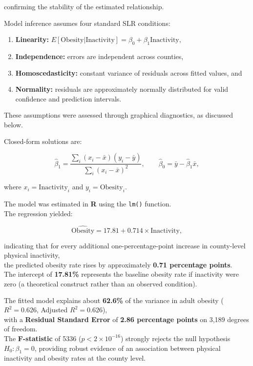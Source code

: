 \documentclass[
  letterpaper,
  DIV=11,
  numbers=noendperiod]{scrartcl}
\providecommand{\tightlist}{%
  \setlength{\itemsep}{0pt}\setlength{\parskip}{0pt}}\usepackage{longtable,booktabs,array}
\begin{document}
confirming the stability of the estimated relationship.

Model inference assumes four standard SLR conditions:

\begin{enumerate}
\def\labelenumi{\arabic{enumi}.}
\tightlist
\item
  \textbf{Linearity:}
  \(E[\text{Obesity}|\text{Inactivity}] = \beta_0 + \beta_1 \text{Inactivity},\)
\item
  \textbf{Independence:} errors are independent across counties,
\item
  \textbf{Homoscedasticity:} constant variance of residuals across
  fitted values, and
\item
  \textbf{Normality:} residuals are approximately normally distributed
  for valid confidence and prediction intervals.
\end{enumerate}

These assumptions were assessed through graphical diagnostics, as
discussed below.

Closed-form solutions are:

\[
\hat{\beta}_1 = \frac{\sum_i (x_i - \bar{x})(y_i - \bar{y})}{\sum_i (x_i - \bar{x})^2}, 
\qquad
\hat{\beta}_0 = \bar{y} - \hat{\beta}_1 \bar{x},
\]

where \(x_i = \text{Inactivity}_i\) and \(y_i = \text{Obesity}_i\).

The model was estimated in \textbf{R} using the \texttt{lm()}
function.\\
The regression yielded:

\[
\widehat{\text{Obesity}} = 17.81 + 0.714 \times \text{Inactivity},
\]

indicating that for every additional one-percentage-point increase in
county-level physical inactivity,\\
the predicted obesity rate rises by approximately \textbf{0.71
percentage points}.\\
The intercept of \textbf{17.81\%} represents the baseline obesity rate
if inactivity were zero (a theoretical construct rather than an observed
condition).

The fitted model explains about \textbf{62.6\%} of the variance in adult
obesity (\(R^2 = 0.626\), Adjusted \(R^2 = 0.626\)),\\
with a \textbf{Residual Standard Error} of \textbf{2.86 percentage
points} on 3,189 degrees of freedom.\\
The \textbf{F-statistic} of 5336 (\(p < 2 \times 10^{-16}\)) strongly
rejects the null hypothesis\\
\(H_0: \beta_1 = 0\), providing robust evidence of an association
between physical inactivity and obesity rates at the county level.
\end{document}

